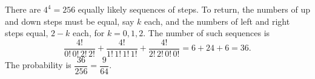 There are $4^4=256$ equally likely sequences of steps. To return, the numbers of up and down steps must be equal, say $k$ each, and the numbers of left and right steps equal, $2-k$ each, for $k=0,1,2$. The number of such sequences is
\[
\dfrac{4!}{0!\,0!\,2!\,2!}+\dfrac{4!}{1!\,1!\,1!\,1!}+\dfrac{4!}{2!\,2!\,0!\,0!}=6+24+6=36 .
\]
The probability is $\dfrac{36}{256}=\boxed{\dfrac{9}{64}}$.
